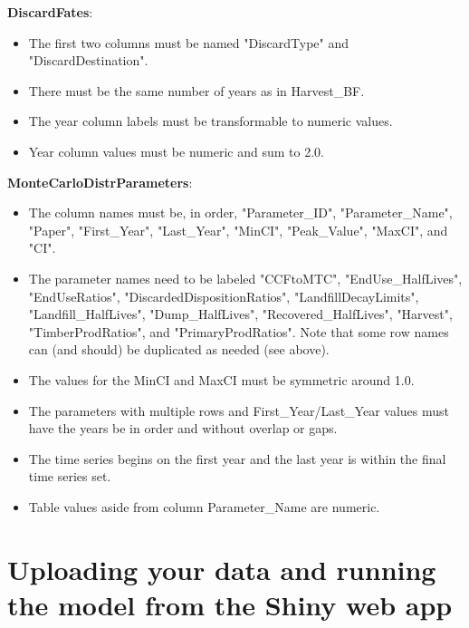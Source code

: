 \documentclass[
  openany]{book}
\providecommand{\tightlist}{%
  \setlength{\itemsep}{0pt}\setlength{\parskip}{0pt}}
\begin{document}
\textbf{DiscardFates}:

\begin{itemize}
\tightlist
\item
  The first two columns must be named "DiscardType" and
  "DiscardDestination".\\
\item
  There must be the same number of years as in Harvest\_BF.\\
\item
  The year column labels must be transformable to numeric values.\\
\item
  Year column values must be numeric and sum to 2.0.
\end{itemize}

\textbf{MonteCarloDistrParameters}:

\begin{itemize}
\tightlist
\item
  The column names must be, in order, "Parameter\_ID",
  "Parameter\_Name", "Paper", "First\_Year", "Last\_Year", "MinCI",
  "Peak\_Value", "MaxCI", and "CI".\\
\item
  The parameter names need to be labeled "CCFtoMTC",
  "EndUse\_HalfLives", "EndUseRatios", "DiscardedDispositionRatios",
  "LandfillDecayLimits", "Landfill\_HalfLives", "Dump\_HalfLives",
  "Recovered\_HalfLives", "Harvest", "TimberProdRatios", and
  "PrimaryProdRatios". Note that some row names can (and should) be
  duplicated as needed (see above).\\
\item
  The values for the MinCI and MaxCI must be symmetric around 1.0.\\
\item
  The parameters with multiple rows and First\_Year/Last\_Year values
  must have the years be in order and without overlap or gaps.\\
\item
  The time series begins on the first year and the last year is within
  the final time series set.\\
\item
  Table values aside from column Parameter\_Name are numeric.
\end{itemize}

\hypertarget{own-shiny}{%
\section{Uploading your data and running the model from the Shiny web
app}\label{own-shiny}}
\end{document}

